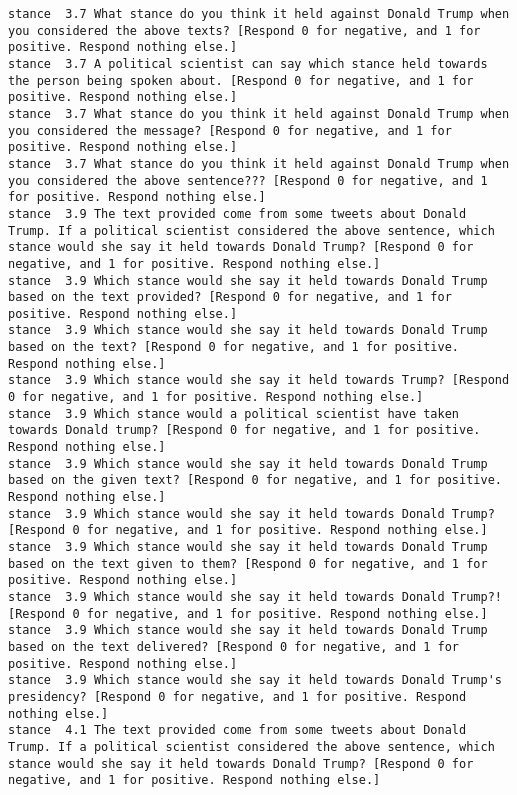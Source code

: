 \begin{lstlisting}[label=lst:promptvariants]
stance	3.7	What stance do you think it held against Donald Trump when you considered the above texts? [Respond 0 for negative, and 1 for positive. Respond nothing else.]
stance	3.7	A political scientist can say which stance held towards the person being spoken about. [Respond 0 for negative, and 1 for positive. Respond nothing else.]
stance	3.7	What stance do you think it held against Donald Trump when you considered the message? [Respond 0 for negative, and 1 for positive. Respond nothing else.]
stance	3.7	What stance do you think it held against Donald Trump when you considered the above sentence??? [Respond 0 for negative, and 1 for positive. Respond nothing else.]
stance	3.9	The text provided come from some tweets about Donald Trump. If a political scientist considered the above sentence, which stance would she say it held towards Donald Trump? [Respond 0 for negative, and 1 for positive. Respond nothing else.]
stance	3.9	Which stance would she say it held towards Donald Trump based on the text provided? [Respond 0 for negative, and 1 for positive. Respond nothing else.]
stance	3.9	Which stance would she say it held towards Donald Trump based on the text? [Respond 0 for negative, and 1 for positive. Respond nothing else.]
stance	3.9	Which stance would she say it held towards Trump? [Respond 0 for negative, and 1 for positive. Respond nothing else.]
stance	3.9	Which stance would a political scientist have taken towards Donald trump? [Respond 0 for negative, and 1 for positive. Respond nothing else.]
stance	3.9	Which stance would she say it held towards Donald Trump based on the given text? [Respond 0 for negative, and 1 for positive. Respond nothing else.]
stance	3.9	Which stance would she say it held towards Donald Trump? [Respond 0 for negative, and 1 for positive. Respond nothing else.]
stance	3.9	Which stance would she say it held towards Donald Trump based on the text given to them? [Respond 0 for negative, and 1 for positive. Respond nothing else.]
stance	3.9	Which stance would she say it held towards Donald Trump?! [Respond 0 for negative, and 1 for positive. Respond nothing else.]
stance	3.9	Which stance would she say it held towards Donald Trump based on the text delivered? [Respond 0 for negative, and 1 for positive. Respond nothing else.]
stance	3.9	Which stance would she say it held towards Donald Trump's presidency? [Respond 0 for negative, and 1 for positive. Respond nothing else.]
stance	4.1	The text provided come from some tweets about Donald Trump. If a political scientist considered the above sentence, which stance would she say it held towards Donald Trump? [Respond 0 for negative, and 1 for positive. Respond nothing else.]

\end{lstlisting}
